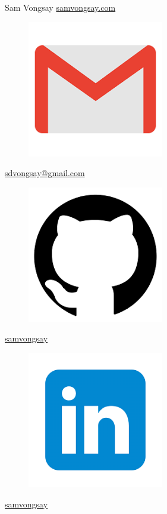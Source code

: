 \documentclass{article}
\begin{document}
Sam Vongsay
\href{www.samvongsay.com}{samvongsay.com}

\begin{figure}[h!]
	\includegraphics[width=0.05\linewidth]{images/gmail_icon.png}
\end{figure}
\href{mailto:sdvongsay@gmail.com}{sdvongsay@gmail.com}

\begin{figure}[h!]
	\includegraphics[width=0.05\linewidth]{images/github_icon.png}
\end{figure}
\href{www.github.com/samvongsay}{samvongsay}

\begin{figure}[h!]
	\includegraphics[width=0.05\linewidth]{images/linkedin_icon.png}
\end{figure}
\href{www.linkedin.com/in/samvongsay}{samvongsay}
\end{document}
